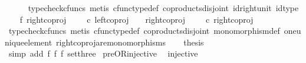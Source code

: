 \begin{isabellebody}
\ \ \ \ \isamarkupfalse%
\ {\isacharparenleft}{\kern0pt}typecheck{\isacharunderscore}{\kern0pt}cfuncs{\isacharcomma}{\kern0pt}\ metis\ cfunc{\isacharunderscore}{\kern0pt}type{\isacharunderscore}{\kern0pt}def\ coproducts{\isacharunderscore}{\kern0pt}disjoint\ id{\isacharunderscore}{\kern0pt}right{\isacharunderscore}{\kern0pt}unit\ id{\isacharunderscore}{\kern0pt}type{\isacharparenright}{\kern0pt}\isanewline
\ \ \isamarkupfalse%
\ f{}{\isacharcolon}{\kern0pt}\ {\isachardoublequoteopen}right{\isacharunderscore}{\kern0pt}coproj\ {\isasymone}\ {\isacharparenleft}{\kern0pt}{\isasymone}\ {\isasymCoprod}\ {\isasymone}{\isacharparenright}{\kern0pt}\ {\isasymcirc}\isactrlsub c\ left{\isacharunderscore}{\kern0pt}coproj\ {\isasymone}\ {\isasymone}\ {\isasymnoteq}\ right{\isacharunderscore}{\kern0pt}coproj\ {\isasymone}\ {\isacharparenleft}{\kern0pt}{\isasymone}\ {\isasymCoprod}\ {\isasymone}{\isacharparenright}{\kern0pt}\ {\isasymcirc}\isactrlsub c\ right{\isacharunderscore}{\kern0pt}coproj\ {\isasymone}\ {\isasymone}{\isachardoublequoteclose}\isanewline
\ \ \ \ \isamarkupfalse%
\ {\isacharparenleft}{\kern0pt}typecheck{\isacharunderscore}{\kern0pt}cfuncs{\isacharcomma}{\kern0pt}\ metis\ cfunc{\isacharunderscore}{\kern0pt}type{\isacharunderscore}{\kern0pt}def\ coproducts{\isacharunderscore}{\kern0pt}disjoint\ monomorphism{\isacharunderscore}{\kern0pt}def\ one{\isacharunderscore}{\kern0pt}unique{\isacharunderscore}{\kern0pt}element\ right{\isacharunderscore}{\kern0pt}coproj{\isacharunderscore}{\kern0pt}are{\isacharunderscore}{\kern0pt}monomorphisms{\isacharparenright}{\kern0pt}\isanewline
\ \ \isamarkupfalse%
\ {\isacharquery}{\kern0pt}thesis\isanewline
\ \ \ \ \isamarkupfalse%
\ {\isacharparenleft}{\kern0pt}simp\ add{\isacharcolon}{\kern0pt}\ f{}\ f{}\ f{}\ set{\isacharunderscore}{\kern0pt}three{\isacharparenright}{\kern0pt}\isanewline
{}\isamarkupfalse%
%
\endisatagproof
{\isafoldproof}%
%
\isadelimproof
\isanewline
%
\endisadelimproof
\isanewline
{}\isamarkupfalse%
\ pre{\isacharunderscore}{\kern0pt}OR{\isacharunderscore}{\kern0pt}injective{\isacharcolon}{\kern0pt}\isanewline
\ \ {\isachardoublequoteopen}injective{\isacharparenleft}{\kern0pt}{\isasymlangle}{\isasymt}{\isacharcomma}{\kern0pt}\ {\isasymt}{\isasymrangle}{\isasymamalg}\ {\isacharparenleft}{\kern0pt}{\isasymlangle}{\isasymt}{\isacharcomma}{\kern0pt}\ {\isasymf}{\isasymrangle}\ {\isasymamalg}{\isasymlangle}{\isasymf}{\isacharcomma}{\kern0pt}\ {\isasymt}{\isasymrangle}{\isacharparenright}{\kern0pt}{\isacharparenright}{\kern0pt}{\isachardoublequoteclose}\isanewline

\end{isabellebody}
